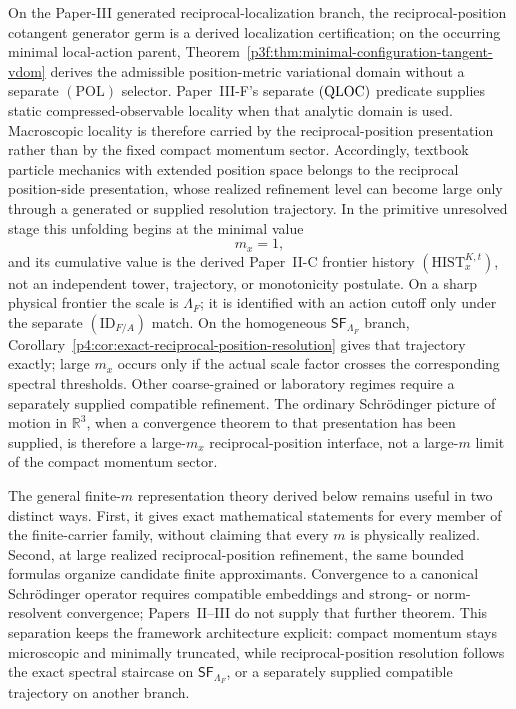 \documentclass[12pt,a4paper]{article}
\begin{document}
On the Paper-III generated reciprocal-localization branch, the
reciprocal-position cotangent generator germ is a derived localization
certification; on the occurring minimal local-action parent,
Theorem~\ref{p3f:thm:minimal-configuration-tangent-vdom} derives the
admissible position-metric variational domain without a separate
\((\mathrm{POL})\) selector.  Paper~III-F's separate
\(({\rm QLOC})\) predicate supplies static compressed-observable locality
when that analytic domain is used.  Macroscopic locality is therefore carried
by the reciprocal-position presentation rather than by the fixed compact
momentum sector.
Accordingly, textbook particle mechanics with extended position space belongs
to the reciprocal position-side presentation, whose realized refinement level
can become large only through a generated or supplied resolution trajectory.
In the primitive unresolved stage
this unfolding begins at the minimal value
\begin{equation}
\label{p4:eq:m-position-initial}
m_x=1,
\end{equation}
and its cumulative value is the derived Paper~II-C frontier history
\((\mathrm{HIST}_{x}^{K,t})\), not an independent tower, trajectory, or
monotonicity postulate.  On a sharp physical frontier the scale is
\(\Lambda_F\); it is identified with an action cutoff only under the separate
\((\mathrm{ID}_{F/A})\) match.
On the homogeneous \(\mathsf{SF}_{\Lambda_F}\) branch,
Corollary~\ref{p4:cor:exact-reciprocal-position-resolution} gives that
trajectory exactly; large \(m_x\) occurs only if the actual scale factor
crosses the corresponding spectral thresholds.  Other coarse-grained or
laboratory regimes require a separately supplied compatible refinement.  The ordinary Schr\"odinger
picture of motion in \(\mathbb R^3\), when a convergence theorem to that
presentation has been supplied, is therefore a large-\(m_x\) reciprocal-position
interface, not a large-\(m\) limit of the compact momentum sector.

The general finite-\(m\) representation theory derived below remains useful in two distinct ways.
First, it gives exact mathematical statements for every member of the
finite-carrier family, without claiming that every \(m\) is physically
realized.
Second, at large realized reciprocal-position refinement, the same bounded
formulas organize candidate finite approximants.  Convergence to a canonical
Schr\"odinger operator requires compatible embeddings and strong- or
norm-resolvent convergence; Papers~II--III do not supply that further theorem.
This separation keeps the framework architecture explicit: compact momentum
stays microscopic and minimally truncated, while reciprocal-position
resolution follows the exact spectral staircase on
\(\mathsf{SF}_{\Lambda_F}\), or a separately supplied compatible trajectory on
another branch.
\end{document}

